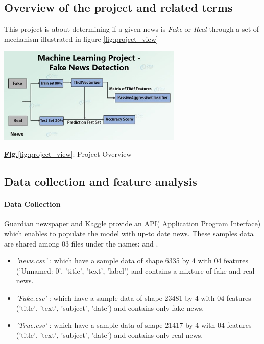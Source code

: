 \documentclass[11.5pt]{article}
\begin{document}
\begin{multicols}{2}
\subsection{Overview of the project and related terms}
This project is about determining if a given news is \textit{Fake} or \textit{Real} through a set of mechanism illustrated in figure \ref{fig:project_view}
\begin{center}
    \centering
    \includegraphics[width=8.8cm]{model.jpg}
    \caption{\underline{\textbf{Fig.}\ref{fig:project_view}}: Project Overview}
    \label{fig:project_view}
\end{center}

\subsection{Data collection and feature analysis}
\paragraph{Data Collection---}
Guardian newspaper and Kaggle provide an API( Application Program Interface) which enables to populate the model with up-to date news. These samples data are shared among 03 files under the names:   and .
\begin{itemize}
    \item \textit{'news.csv'} : which have a sample data of shape 6335 by 4 with 04 features ('Unnamed: 0', 'title', 'text', 'label') and contains a mixture of fake and real news.
    \item \textit{'Fake.csv'} : which have a sample data of shape 23481 by 4 with 04 features ('title', 'text', 'subject', 'date') and contains only fake news.
    \item \textit{'True.csv'} : which have a sample data of shape 21417 by 4 with 04 features ('title', 'text', 'subject', 'date') and contains only real news.
\end{itemize}


\end{multicols}
\end{document}
